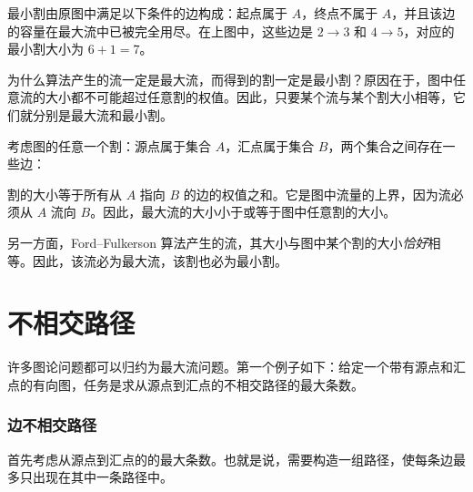 最小割由原图中满足以下条件的边构成：起点属于 $A$，终点不属于 $A$，并且该边的容量在最大流中已被完全用尽。在上图中，这些边是 $2 \rightarrow 3$ 和 $4 \rightarrow 5$，对应的最小割大小为 $6+1=7$。

为什么算法产生的流一定是最大流，而得到的割一定是最小割？原因在于，图中任意流的大小都不可能超过任意割的权值。因此，只要某个流与某个割大小相等，它们就分别是最大流和最小割。

考虑图的任意一个割：源点属于集合 $A$，汇点属于集合 $B$，两个集合之间存在一些边：

\begin{center}
\end{center}

割的大小等于所有从 $A$ 指向 $B$ 的边的权值之和。它是图中流量的上界，因为流必须从 $A$ 流向 $B$。因此，最大流的大小小于或等于图中任意割的大小。

另一方面，Ford--Fulkerson 算法产生的流，其大小与图中某个割的大小\emph{恰好}相等。因此，该流必为最大流，该割也必为最小割。

\section{不相交路径}

许多图论问题都可以归约为最大流问题。第一个例子如下：给定一个带有源点和汇点的有向图，任务是求从源点到汇点的不相交路径的最大条数。

\subsubsection{边不相交路径}

首先考虑从源点到汇点的的最大条数。也就是说，需要构造一组路径，使每条边最多只出现在其中一条路径中。

